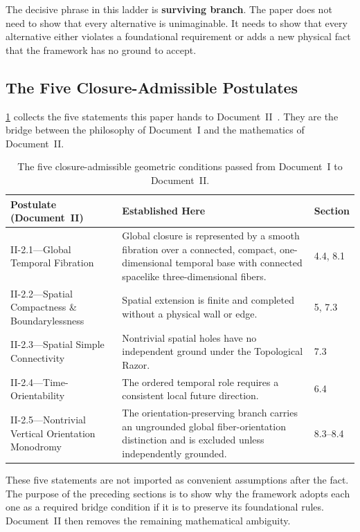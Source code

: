 \documentclass[11pt]{article}
\theoremstyle{canonstyle}
\begin{document}
The decisive phrase in this ladder is \textbf{surviving branch}. The paper does not need to show that every alternative is unimaginable. It needs to show that every alternative either violates a foundational requirement or adds a new physical fact that the framework has no ground to accept.

\newpage
\subsection{The Five Closure-Admissible Postulates}

\cref{tab:postulates} collects the five statements this paper hands to Document~II~\cite{CanonWhat}. They are the bridge between the philosophy of Document~I and the mathematics of Document~II.

\begin{table}[h]
\centering
\small
\begin{tabularx}{\textwidth}{@{}>{\raggedright\arraybackslash}p{4.8cm}X p{1.7cm}@{}}
\toprule
\textbf{Postulate (Document~II)} & \textbf{Established Here} & \textbf{Section} \\
\midrule
II-2.1---Global Temporal Fibration & Global closure is represented by a smooth fibration over a connected, compact, one-dimensional temporal base with connected spacelike three-dimensional fibers. & 4.4, 8.1 \\
II-2.2---Spatial Compactness \& Boundarylessness & Spatial extension is finite and completed without a physical wall or edge. & 5, 7.3 \\
II-2.3---Spatial Simple Connectivity & Nontrivial spatial holes have no independent ground under the Topological Razor. & 7.3 \\
II-2.4---Time-Orientability & The ordered temporal role requires a consistent local future direction. & 6.4 \\
II-2.5---Nontrivial Vertical Orientation Monodromy & The orientation-preserving branch carries an ungrounded global fiber-orientation distinction and is excluded unless independently grounded. & 8.3--8.4 \\
\bottomrule
\end{tabularx}
\caption{The five closure-admissible geometric conditions passed from Document~I to Document~II.}
\label{tab:postulates}
\end{table}

These five statements are not imported as convenient assumptions after the fact. The purpose of the preceding sections is to show why the framework adopts each one as a required bridge condition if it is to preserve its foundational rules. Document~II then removes the remaining mathematical ambiguity.
\end{document}
